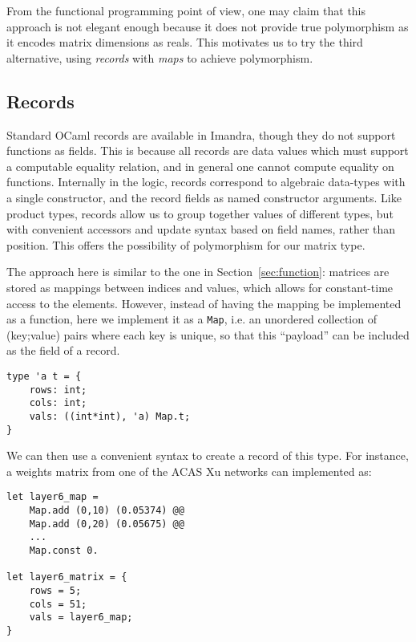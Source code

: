 \documentclass[runningheads]{llncs}
\newcommand{\knote}[1]{\todo[inline, color=blue!20]{#1}}
\begin{document}
From the functional programming point of view, one may claim that this approach is not elegant enough because
it does not provide true polymorphism as it encodes matrix dimensions as reals.
This motivates us to try the third alternative, using \emph{records} with \emph{maps} to achieve polymorphism.

\subsection{Records}

Standard OCaml records are available in Imandra, though they do not support functions as fields. This is because all records are data values which must support a computable equality relation, and in general one cannot compute equality on functions. Internally in the logic, records correspond to algebraic data-types with a single constructor, and the record fields as named constructor arguments. Like product types, records allow us to group together values of different types, but with convenient accessors and update syntax based on field names, rather than position. This offers the possibility of polymorphism for our matrix type. 

The approach here is similar to the one in Section~\ref{sec:function}: matrices are stored as mappings between indices and values, which allows for constant-time access to the elements. However, instead of having the mapping be implemented as a function, here we implement it as a \lstinline{Map}, i.e. an unordered collection of (key;value) pairs where each key is unique, so that this ``payload'' can be included as the field of a record. 

\begin{lstlisting}[language=caml]
type 'a t = {
	rows: int;
	cols: int;
	vals: ((int*int), 'a) Map.t;
}
\end{lstlisting}

We can then use a convenient syntax to create a record of this type. For instance, a weights matrix from one of the ACAS Xu networks can implemented as:

\begin{lstlisting}[language=caml]
let layer6_map =
	Map.add (0,10) (0.05374) @@
	Map.add (0,20) (0.05675) @@
	...
	Map.const 0.

let layer6_matrix = {
	rows = 5;
	cols = 51;
	vals = layer6_map;
}
\end{lstlisting}
\end{document}
